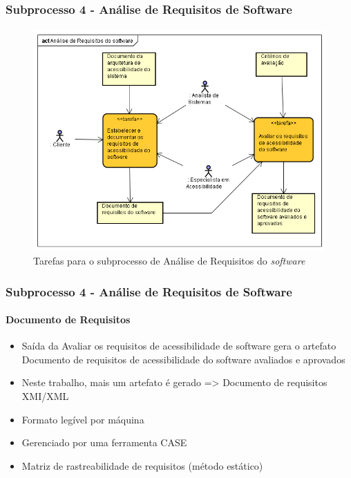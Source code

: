 \documentclass{beamer}
\begin{document}
\begin{frame}
\frametitle{Subprocesso 4 - Análise de Requisitos de Software}
\framesubtitle{}

\begin{figure}[htbp] \centering
	\includegraphics[width=\textwidth,height=.65\textheight,keepaspectratio]{./img/subprocesso4.png}
	\caption{Tarefas para o subprocesso de Análise de Requisitos do \textit{software} \citep{maia:10}}
	\label{fig:sub4}
\end{figure}

\end{frame}

\begin{frame}
\frametitle{Subprocesso 4 - Análise de Requisitos de Software}
\framesubtitle{Documento de Requisitos}

\begin{itemize}
  \item Saída da Avaliar os requisitos de acessibilidade de software gera o artefato Documento de requisitos de acessibilidade do software avaliados e aprovados
  \item Neste trabalho, mais um artefato é gerado => Documento de requisitos XMI/XML
  \item Formato legível por máquina
  \item Gerenciado por uma ferramenta CASE
  \item Matriz de rastreabilidade de requisitos (método estático) \citep{guo:2009:OBI:1681515.1682933}
\end{itemize}

\end{frame}
\end{document}
